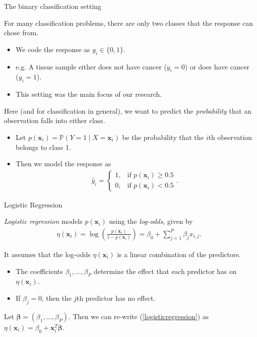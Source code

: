 \documentclass[8pt]{beamer}
\newcommand{\mys}{\vspace{0.5cm} \pause
}
\newcommand{\mysa}{\vspace{0.2cm} \pause
}
\begin{document}
\begin{frame}{\color{white} The binary classification setting}

For many classification problems, there are only two classes that the response can chose from.
\begin{itemize}
    \item We code the response as $y_i \in \{ 0,1 \}$.
    \item e.g. A tissue sample either does not have cancer ($y_i = 0$) or does have cancer ($y_i = 1$).
    \item This setting was the main focus of our research. 
\end{itemize} \mys 

Here (and for classification in general), we want to predict the \textit{probability} that an observation falls into either class.
\begin{itemize}
    \item Let $p(\bm{x}_i) = \mathbb{P}(Y = 1 \mid X = \bm{x}_i)$ be the probability that the $i$th observation belongs to class 1.
    \item Then we model the response as 
    \begin{align*}
        \hat{y}_i = \begin{cases}
        1, & \text{if } p(\bm{x}_i) \ge 0.5 \\
        0, & \text{if } p(\bm{x}_i) < 0.5
        \end{cases}.
    \end{align*}
\end{itemize}
    
\end{frame}

\begin{frame}{Logistic Regression}

\textit{Logistic regression} models $p(\bm{x}_i)$ using the \textit{log-odds}, given by
\begin{align}
    \label{logisticregression}
    \eta(\bm{x}_i) = \log \left( \frac{p(\bm{x}_i)}{1 - p(\bm{x}_i)} \right) = \beta_0 + \sum_{j=1}^P \beta_j x_{i, j}.
\end{align} \mysa

It assumes that the log-odds $\eta(\bm{x}_i)$ is a linear combination of the predictors.
\begin{itemize}
    \item The coefficients $\beta_1, \ldots, \beta_P$ determine the effect that each predictor has on $\eta(\bm{x}_i)$.
    \item If $\beta_j = 0$, then the $j$th predictor has no effect.
\end{itemize} \mys

Let $\bm{\beta} = (\beta_1, \ldots, \beta_P)$. Then we can re-write (\ref{logisticregression}) as $\eta(\bm{x}_i) = \beta_0 + \bm{x}_i^T \bm{\beta}$.

    
\end{frame}
\end{document}
